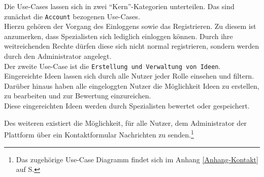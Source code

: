 Die Use-Cases lassen sich in zwei \enquote{Kern}-Kategorien unterteilen.
Das sind zunächst die \texttt{Account} bezogenen Use-Cases.\\
Hierzu gehören der Vorgang des Einloggens sowie das Registrieren. Zu diesem ist anzumerken, dass Spezialisten sich lediglich einloggen können.
Durch ihre weitreichenden Rechte dürfen diese sich nicht normal registrieren, sondern werden durch den Administrator angelegt.\\
Der zweite Use-Case ist die \texttt{Erstellung und Verwaltung von Ideen}.\\
Eingereichte Ideen lassen sich durch alle Nutzer jeder Rolle einsehen und filtern. Darüber hinaus haben alle eingeloggten Nutzer die Möglichkeit Ideen zu erstellen, zu bearbeiten und zur Bewertung einzureichen.\\
Diese eingereichten Ideen werden durch Spezialisten bewertet oder gespeichert.

Des weiteren existiert die Möglichkeit, für alle Nutzer, dem Administrator der Plattform über ein Kontaktformular Nachrichten zu senden.\footnote{Das zugehörige Use-Case Diagramm findet sich im Anhang \ref{Anhang-Kontakt} auf S.\pageref{Anhang-Kontakt}}